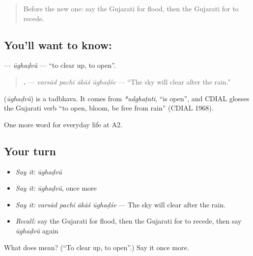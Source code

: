 \label{lesson:GU-C220-ughadvu}



\begin{quote}
Before the new one: say the Gujarati for flood, then the Gujarati for to recede.
\end{quote}

\subsection*{You'll want to know: }
\textbf{} — \emph{ūghaḍvũ} — \textquotedblleft{}to clear up, to open\textquotedblright{}.

\begin{quote}
\textbf{   .} — \emph{varsād pachī ākāś ūghaḍśe} — \textquotedblleft{}The sky will clear after the rain.\textquotedblright{}
\end{quote}

\begin{cousinweb}
\textbf{} (\emph{ūghaḍvũ}) is a tadbhava. It comes from \emph{*udghaṭati}, \textquotedblleft{}is open\textquotedblright{}, and CDIAL glosses the Gujarati verb \textquotedblleft{}to open, bloom, be free from rain\textquotedblright{} (CDIAL 1968).
\end{cousinweb}

\begin{grammarlens}[title={What you've built}]
One more word for everyday life at A2.
\end{grammarlens}

\subsection*{Your turn}
\begin{itemize}
\raggedright
  \item \emph{Say it:} \emph{ūghaḍvũ}
  \item \emph{Say it:} \emph{ūghaḍvũ}, once more
  \item \emph{Say it:} \emph{varsād pachī ākāś ūghaḍśe} — The sky will clear after the rain.
  \item \emph{Recall:} say the Gujarati for flood, then the Gujarati for to recede, then say \emph{ūghaḍvũ} again
\end{itemize}

\begin{tcolorbox}[breakable,colback=teal!4,colframe=teal!35!black,title={Before you move on}]
What does  mean? (\textquotedblleft{}To clear up, to open\textquotedblright{}.) Say it once more.
\end{tcolorbox}
